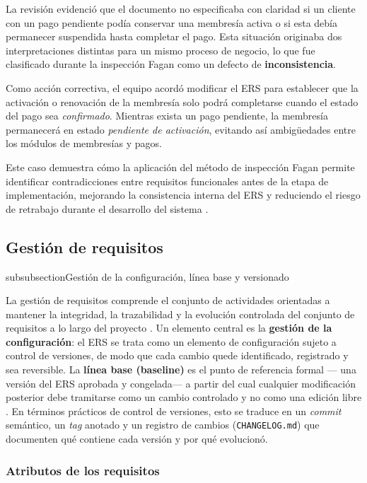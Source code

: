 \documentclass[11pt,a4paper]{article}
\begin{document}
La revisión evidenció que el documento no especificaba con claridad si un
cliente con un pago pendiente podía conservar una membresía activa o si esta
debía permanecer suspendida hasta completar el pago. Esta situación originaba
dos interpretaciones distintas para un mismo proceso de negocio, lo que fue
clasificado durante la inspección Fagan como un defecto de \textbf{inconsistencia}.

Como acción correctiva, el equipo acordó modificar el ERS para establecer que
la activación o renovación de la membresía solo podrá completarse cuando el
estado del pago sea \textit{confirmado}. Mientras exista un pago pendiente, la
membresía permanecerá en estado \textit{pendiente de activación}, evitando así
ambigüedades entre los módulos de membresías y pagos.

Este caso demuestra cómo la aplicación del método de inspección Fagan permite
identificar contradicciones entre requisitos funcionales antes de la etapa de
implementación, mejorando la consistencia interna del ERS y reduciendo el riesgo
de retrabajo durante el desarrollo del sistema \cite{pohl2025,swebok_v4}. 

\subsection{Gestión de requisitos}
subsubsection{Gestión de la configuración, línea base y versionado}
 
La gestión de requisitos comprende el conjunto de actividades orientadas a
mantener la integridad, la trazabilidad y la evolución controlada del
conjunto de requisitos a lo largo del proyecto \cite{iso29148_2018,
iso15288_2023}. Un elemento central es la \textbf{gestión de la
configuración}: el ERS se trata como un elemento de configuración sujeto a
control de versiones, de modo que cada cambio quede identificado,
registrado y sea reversible. La \textbf{línea base (baseline)} es el punto
de referencia formal --- una versión del ERS aprobada y congelada--- a
partir del cual cualquier modificación posterior debe tramitarse como un
cambio controlado y no como una edición libre \cite{iso12207_2017,
pohl2025}. En términos prácticos de control de versiones, esto se traduce
en un \emph{commit} semántico, un \emph{tag} anotado y un registro de
cambios (\texttt{CHANGELOG.md}) que documenten qué contiene cada versión y
por qué evolucionó.
 
\subsubsection{Atributos de los requisitos}
 
\end{document}
